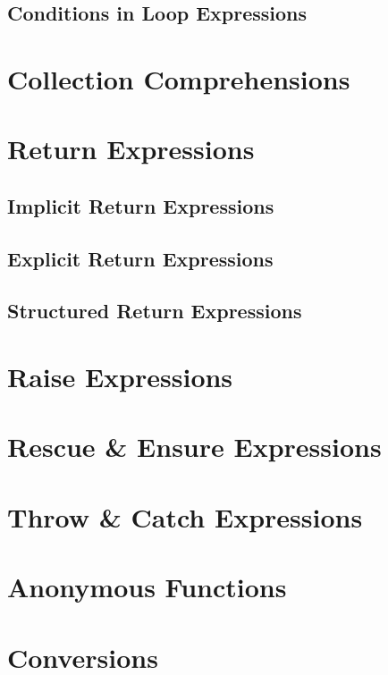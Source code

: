 \subsection{Conditions in Loop Expressions}

\section{Collection Comprehensions}

\section{Return Expressions}

\subsection{Implicit Return Expressions}

\subsection{Explicit Return Expressions}

\subsection{Structured Return Expressions}

\section{Raise Expressions}

\section{Rescue \& Ensure Expressions}

\section{Throw \& Catch Expressions}

\section{Anonymous Functions}

\section{Conversions}

